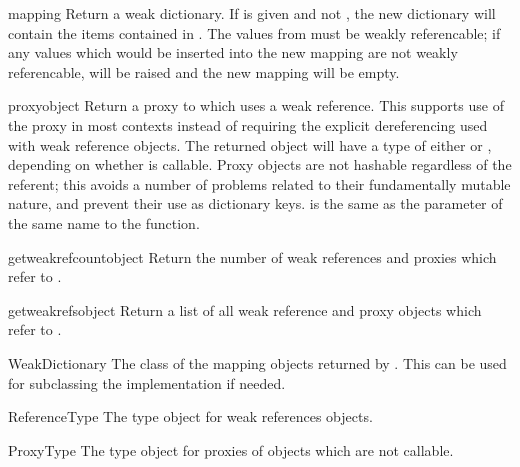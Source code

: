 \begin{funcdesc}{mapping}{}
  Return a weak dictionary.  If  is given and not
  , the new dictionary will contain the items contained in
  .  The values from  must be weakly referencable;
  if any values which would be inserted into the new mapping are not
  weakly referencable,  will be raised and the
  new mapping will be empty.
\end{funcdesc}

\begin{funcdesc}{proxy}{object}
  Return a proxy to  which uses a weak reference.  This
  supports use of the proxy in most contexts instead of requiring the
  explicit dereferencing used with weak reference objects.  The
  returned object will have a type of either  or
  , depending on whether  is
  callable.  Proxy objects are not hashable regardless of the
  referent; this avoids a number of problems related to their
  fundamentally mutable nature, and prevent their use as dictionary
  keys.   is the same as the parameter of the same name
  to the  function.
\end{funcdesc}

\begin{funcdesc}{getweakrefcount}{object}
  Return the number of weak references and proxies which refer to
  .
\end{funcdesc}

\begin{funcdesc}{getweakrefs}{object}
  Return a list of all weak reference and proxy objects which refer to
  .
\end{funcdesc}

\begin{classdesc}{WeakDictionary}{}
  The class of the mapping objects returned by .
  This can be used for subclassing the implementation if needed.
\end{classdesc}

\begin{datadesc}{ReferenceType}
  The type object for weak references objects.
\end{datadesc}

\begin{datadesc}{ProxyType}
  The type object for proxies of objects which are not callable.
\end{datadesc}

